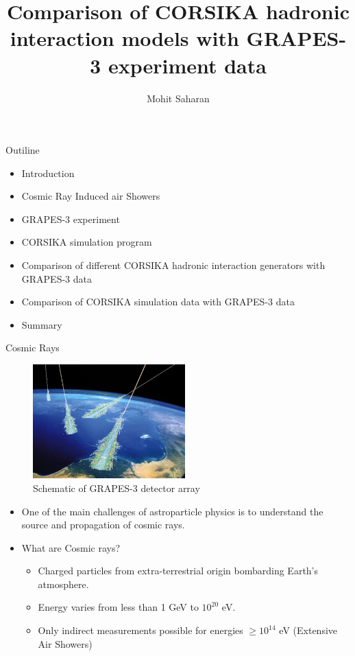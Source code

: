 \documentclass{beamer}
\title{Comparison of CORSIKA hadronic interaction models with GRAPES-3 experiment data}
\author{Mohit Saharan}
\institute{GRAPES-3 Interaction Meeting}
\begin{document}
\frame{\titlepage}


\begin{frame}{Outiline}
\begin{itemize}
    \item Introduction
    \item Cosmic Ray Induced air Showers
    \item GRAPES-3 experiment
    \item CORSIKA simulation program
    \item Comparison of different CORSIKA hadronic interaction generators with GRAPES-3 data
    \item Comparison of CORSIKA simulation data with GRAPES-3 data
    \item Summary
\end{itemize}
\end{frame}


\begin{frame}{Cosmic Rays}


\begin{figure}
	\includegraphics[width=0.9\linewidth, height=4.4cm]{cosmic_rays} 
\caption{Schematic of GRAPES-3 detector array}
\label{fig:cosmic_rays}
\end{figure}


\begin{itemize}
    \item One of the main challenges of astroparticle physics is to understand the source and propagation of cosmic rays.	
    \item What are Cosmic rays?
    \begin{itemize}
    	\item Charged particles from extra-terrestrial origin bombarding Earth’s atmosphere.
    	\item Energy varies from less than 1 GeV to $10^{20}$ eV.
    	\item Only indirect measurements possible for energies $\geq10^{14}$ eV (Extensive Air Showers)
    \end{itemize}
     	
\end{itemize}
\end{frame}
\end{document}
